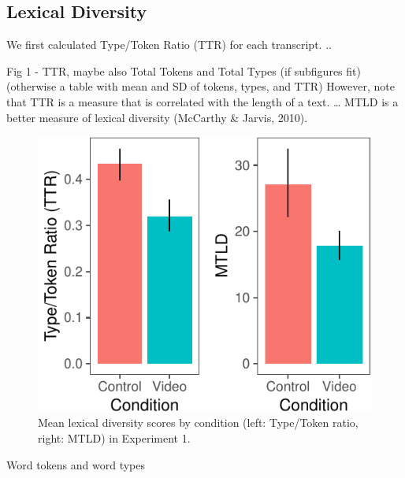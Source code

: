 \documentclass[10pt, letterpaper]{article}
\newenvironment{CodeChunk}{}{}
\begin{document}
\subsection{Lexical Diversity}\label{lexical-diversity}

We first calculated Type/Token Ratio (TTR) for each transcript. ..

Fig 1 - TTR, maybe also Total Tokens and Total Types (if subfigures fit)
(otherwise a table with mean and SD of tokens, types, and TTR) However,
note that TTR is a measure that is correlated with the length of a text.
\ldots{} MTLD is a better measure of lexical diversity (McCarthy \&
Jarvis, 2010).

\begin{CodeChunk}
\begin{figure}[H]

{\centering \includegraphics{figs/e1lex_div-1} 

}

\caption[Mean lexical diversity scores by condition (left]{Mean lexical diversity scores by condition (left: Type/Token ratio, right: MTLD) in Experiment 1.}\label{fig:e1lex_div}
\end{figure}
\end{CodeChunk}

Word tokens and word types
\end{document}
